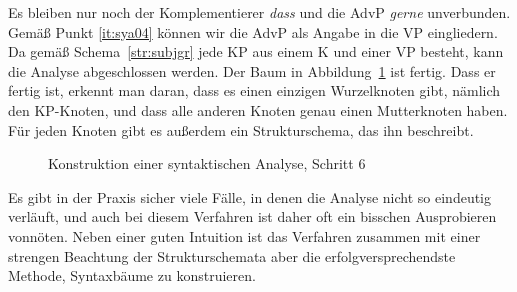 Es bleiben nur noch der Komplementierer \textit{dass} und die AdvP \textit{gerne} unverbunden.
Gemäß Punkt \ref{it:sya04} können wir die AdvP als Angabe in die VP eingliedern.
Da gemäß Schema~\ref{str:subjgr} jede KP aus einem K und einer VP besteht, kann die Analyse abgeschlossen werden.
Der Baum in Abbildung~\ref{fig:sya06} ist fertig.
Dass er fertig ist, erkennt man daran, dass es einen einzigen Wurzelknoten gibt, nämlich den KP-Knoten, und dass alle anderen Knoten genau einen Mutterknoten haben.
Für jeden Knoten gibt es außerdem ein Strukturschema, das ihn beschreibt.

\begin{figure}[!htbp]
  \caption{Konstruktion einer syntaktischen Analyse, Schritt 6}
  \label{fig:sya06}
\end{figure}

Es gibt in der Praxis sicher viele Fälle, in denen die Analyse nicht so eindeutig verläuft, und auch bei diesem Verfahren ist daher oft ein bisschen Ausprobieren vonnöten.
Neben einer guten Intuition ist das Verfahren zusammen mit einer strengen Beachtung der Strukturschemata aber die erfolgversprechendste Methode, Syntaxbäume zu konstruieren.




\Uebungen

